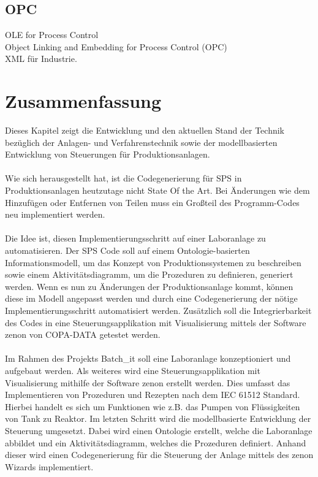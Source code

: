 \subsection{OPC}
OLE for Process Control\\
Object Linking and Embedding for Process Control (OPC)\\
XML für Industrie. 
\newpage
\section{Zusammenfassung}

Dieses Kapitel zeigt die Entwicklung und den aktuellen Stand der Technik bezüglich der Anlagen- und Verfahrenstechnik sowie der modellbasierten Entwicklung von Steuerungen für Produktionsanlagen. \\\\
Wie sich herausgestellt hat, ist die Codegenerierung für SPS in Produktionsanlagen heutzutage nicht State Of the Art. Bei Änderungen wie dem Hinzufügen oder Entfernen von Teilen muss ein Großteil des Programm-Codes neu implementiert werden. \\\\
Die Idee ist, diesen Implementierungsschritt auf einer Laboranlage zu automatisieren. Der SPS Code soll auf einem Ontologie-basierten Informationsmodell, um das Konzept von Produktionssystemen zu beschreiben sowie einem Aktivitätsdiagramm, um die Prozeduren zu definieren, generiert werden. Wenn es nun zu Änderungen der Produktionsanlage kommt, können diese im Modell angepasst werden und durch eine Codegenerierung der nötige Implementierungsschritt automatisiert werden. Zusätzlich soll die Integrierbarkeit des Codes in eine Steuerungsapplikation mit Visualisierung mittels der Software zenon von COPA-DATA getestet werden.\\\\
Im Rahmen des Projekts Batch\_it soll eine Laboranlage konzeptioniert und aufgebaut werden. Als weiteres wird eine Steuerungsapplikation mit Visualisierung mithilfe der Software zenon erstellt werden. Dies umfasst das Implementieren von Prozeduren und Rezepten nach dem IEC 61512 Standard. Hierbei handelt es sich um Funktionen wie z.B. das Pumpen von Flüssigkeiten von Tank zu Reaktor. Im letzten Schritt wird die modellbasierte Entwicklung der Steuerung umgesetzt. Dabei wird einen Ontologie erstellt, welche die Laboranlage abbildet und ein Aktivitätsdiagramm, welches die Prozeduren definiert. Anhand dieser wird einen Codegenerierung für die Steuerung der Anlage mittels des zenon Wizards implementiert.\\\\
